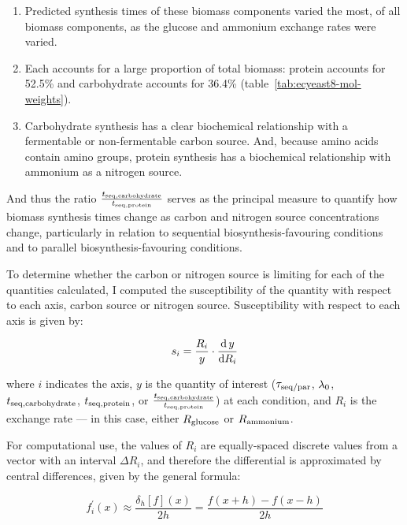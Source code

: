 \begin{enumerate}
  \item Predicted synthesis times of these biomass components varied the most, of all biomass components, as the glucose and ammonium exchange rates were varied.
  \item Each accounts for a large proportion of total biomass: protein accounts for 52.5\% and carbohydrate accounts for 36.4\% (table~\ref{tab:ecyeast8-mol-weights}).
  \item Carbohydrate synthesis has a clear biochemical relationship with a fermentable or non-fermentable carbon source.
        And, because amino acids contain amino groups, protein synthesis has a biochemical relationship with ammonium as a nitrogen source.
\end{enumerate}

And thus the ratio $\frac{t_{\mathrm{seq},\mathrm{carbohydrate}}}{t_{\mathrm{seq},\mathrm{protein}}}$ serves as the principal measure to quantify how biomass synthesis times change as carbon and nitrogen source concentrations change, particularly in relation to sequential biosynthesis-favouring conditions and to parallel biosynthesis-favouring conditions.

To determine whether the carbon or nitrogen source is limiting for each of the quantities calculated, I computed the susceptibility of the quantity with respect to each axis, carbon source or nitrogen source.
Susceptibility with respect to each axis is given by:

\begin{equation}
  s_{i} = \frac{R_{i}}{y} \cdot \frac{\mathrm{d} \, y}{\mathrm{d} R_{i}}
  \label{eq:model-susceptibility}
\end{equation}

where $i$ indicates the axis, $y$ is the quantity of interest ($\tau_{\mathrm{seq}/\mathrm{par}}$, $\lambda_{0}$, $t_{\mathrm{seq},\mathrm{carbohydrate}}$, $t_{\mathrm{seq},\mathrm{protein}}$, or $\frac{t_{\mathrm{seq},\mathrm{carbohydrate}}}{t_{\mathrm{seq},\mathrm{protein}}}$) at each condition, and $R_{i}$ is the exchange rate --- in this case, either $R_{\mathrm{glucose}}$ or $R_{\mathrm{ammonium}}$.

For computational use, the values of $R_{i}$ are equally-spaced discrete values from a vector with an interval $\Delta R_{i}$, and therefore the differential is approximated by central differences, given by the general formula:

\begin{equation}
  f_{i}^{\prime}(x) \approx \frac{\delta_{h}[f](x)}{2h} = \frac{f(x+h) - f(x-h)}{2h}
  \label{eq:model-central-difference}
\end{equation}

